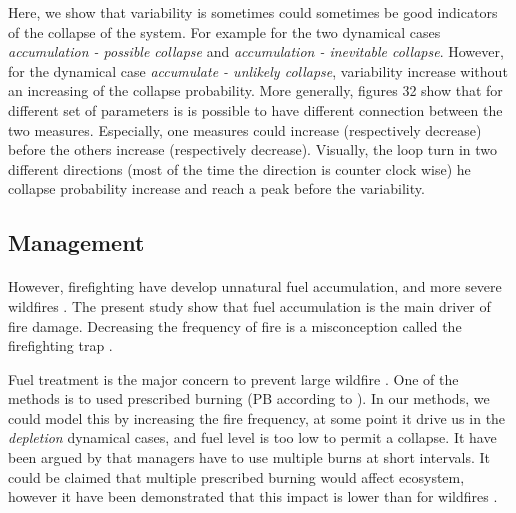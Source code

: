\documentclass{article}
\begin{document}
Here, we show that variability is sometimes could sometimes be good indicators of the collapse of the system. For example for the two dynamical cases \textit{accumulation - possible collapse} and \textit{accumulation - inevitable collapse}. However, for the dynamical case \textit{accumulate - unlikely collapse}, variability increase without an increasing of the collapse probability. More generally, figures 32 \todo{} show that for different set of parameters is is possible to have different connection between the two measures. Especially, one measures could increase (respectively decrease) before the others increase (respectively decrease). Visually, the loop turn in two different directions (most of the time the direction is counter clock wise) he collapse probability increase and reach a peak before the variability.







\subsection{Management}

\paragraph{}
However, firefighting have develop unnatural fuel accumulation, and more severe wildfires \citep{schoennagel_interaction_2004}. The present study show that fuel accumulation is the main driver of fire damage. Decreasing the frequency of fire is a misconception called the firefighting trap \citep{collins_forest_2013}.

Fuel treatment is the major concern to prevent large wildfire \citep{liu_studying_2013, martinson_performance_nodate}. One of the methods is to used prescribed burning (PB according to \cite{liu_analyzing_2010}). In our methods, we could model this by increasing the fire frequency, at some point it drive us in the \textit{depletion} dynamical cases, and fuel level is too low to permit a collapse. It have been argued by \cite{scholl_fire_2010} that managers have to use multiple burns at short intervals. It could be claimed that multiple prescribed burning would affect ecosystem, however it have been demonstrated that this impact is lower than for wildfires \citep{alcaniz2018effects, fultz2016forest, wiedinmyer2010prescribed}. 
\end{document}
